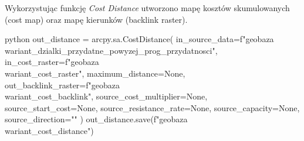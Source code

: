 \documentclass{article}
\begin{document}
Wykorzystując funkcję \textit{Cost Distance} utworzono mapę kosztów skumulowanych (cost map) oraz mapę kierunków (backlink raster).
\vspace{5pt}

\begin{mintedbox}{python}
out_distance = arcpy.sa.CostDistance(
    in_source_data=f"{geobaza}\\{wariant}_dzialki_przydatne_powyzej_{prog_przydatnosci}",
    in_cost_raster=f"{geobaza}\\{wariant}_cost_raster",
    maximum_distance=None,
    out_backlink_raster=f"{geobaza}\\{wariant}_cost_backlink",
    source_cost_multiplier=None,
    source_start_cost=None,
    source_resistance_rate=None,
    source_capacity=None,
    source_direction=""
)
out_distance.save(f"{geobaza}\\{wariant}_cost_distance")
\end{mintedbox}
\vspace{5pt}
\end{document}
